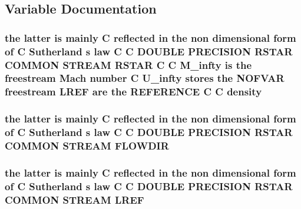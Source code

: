 \subsection{Variable Documentation}
\hypertarget{home_2abonfi_2_c_f_d__codes_2_eul_f_s_83_84_2include_2stream_8com_ae3461cde09d7d40d4800995573999b7e}{
\subsubsection[{density}]{\setlength{\rightskip}{0pt plus 5cm}the latter is mainly C reflected in the non dimensional form of C Sutherland s law C C D\-O\-U\-B\-L\-E P\-R\-E\-C\-I\-S\-I\-O\-N R\-S\-T\-A\-R C\-O\-M\-M\-O\-N S\-T\-R\-E\-A\-M R\-S\-T\-A\-R C C {\bf M\-\_\-infty} is the freestream Mach number C {\bf U\-\_\-infty} stores the N\-O\-F\-V\-A\-R freestream {\bf L\-R\-E\-F} {\bf are} the R\-E\-F\-E\-R\-E\-N\-C\-E C C density}}\label{home_2abonfi_2_c_f_d__codes_2_eul_f_s_83_84_2include_2stream_8com_ae3461cde09d7d40d4800995573999b7e}
\hypertarget{home_2abonfi_2_c_f_d__codes_2_eul_f_s_83_84_2include_2stream_8com_af5929b7a58c2e64c3b9908fd35bc0e5a}{
\subsubsection[{F\-L\-O\-W\-D\-I\-R}]{\setlength{\rightskip}{0pt plus 5cm}the latter is mainly C reflected in the non dimensional form of C Sutherland s law C C D\-O\-U\-B\-L\-E P\-R\-E\-C\-I\-S\-I\-O\-N R\-S\-T\-A\-R C\-O\-M\-M\-O\-N S\-T\-R\-E\-A\-M F\-L\-O\-W\-D\-I\-R}}\label{home_2abonfi_2_c_f_d__codes_2_eul_f_s_83_84_2include_2stream_8com_af5929b7a58c2e64c3b9908fd35bc0e5a}
\hypertarget{home_2abonfi_2_c_f_d__codes_2_eul_f_s_83_84_2include_2stream_8com_a19d492a15feda819ed49e580c6a1568f}{
\subsubsection[{L\-R\-E\-F}]{\setlength{\rightskip}{0pt plus 5cm}the latter is mainly C reflected in the non dimensional form of C Sutherland s law C C D\-O\-U\-B\-L\-E P\-R\-E\-C\-I\-S\-I\-O\-N R\-S\-T\-A\-R C\-O\-M\-M\-O\-N S\-T\-R\-E\-A\-M L\-R\-E\-F}}\label{home_2abonfi_2_c_f_d__codes_2_eul_f_s_83_84_2include_2stream_8com_a19d492a15feda819ed49e580c6a1568f}
